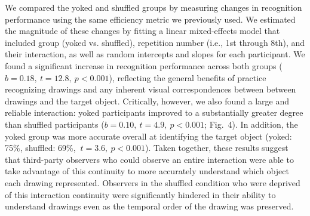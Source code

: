 \documentclass[10pt,letterpaper]{article}
\begin{document}

We compared the yoked and shuffled groups by measuring changes in recognition performance using the same efficiency metric we previously used.
We estimated the magnitude of these changes by fitting a linear mixed-effects model that included group (yoked vs. shuffled), repetition number (i.e., 1st through 8th), and their interaction, as well as random intercepts and slopes for each participant.
We found a significant increase in recognition performance across both groups ($b = 0.18, ~t = 12.8, ~p < 0.001$), reflecting the general benefits of practice recognizing drawings and any inherent visual correspondences between between drawings and the target object.  %
Critically, however, we also found a large and reliable interaction: yoked participants improved to a substantially greater degree than shuffled participants ($b = 0.10, ~t = 4.9, ~p<0.001$; Fig.~4).
In addition, the yoked group was more accurate overall at identifying the target object (yoked: 75\%, shuffled: 69\%, $~t = 3.6, ~p < 0.001$). %
Taken together, these results suggest that third-party observers who could observe an entire interaction were able to take advantage of this continuity to more accurately understand which object each drawing represented. 
Observers in the shuffled condition who were deprived of this interaction continuity were significantly hindered in their ability to understand drawings even as the temporal order of the drawing was preserved.



\end{document}
